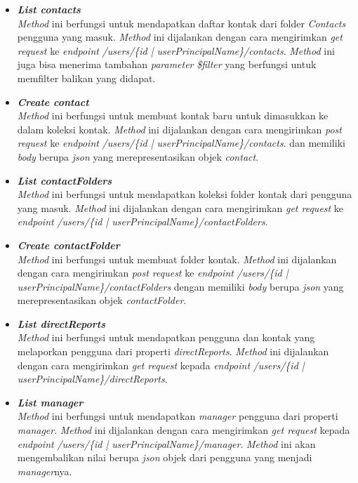 \begin{itemize}
	\item \textbf{\textit{List contacts}}\\
	\textit{Method} ini berfungsi untuk mendapatkan daftar kontak dari folder \textit{Contacts} pengguna yang masuk. \textit{Method} ini dijalankan dengan cara mengirimkan \textit{get request} ke \textit{endpoint} \textit{/users/\{id | userPrincipalName\}/contacts}. \textit{Method} ini juga bisa menerima tambahan \textit{parameter} \textit{\$filter} yang berfungsi untuk memfilter balikan yang didapat. 
	\item \textbf{\textit{Create contact}}\\
	\textit{Method} ini berfungsi untuk membuat kontak baru untuk dimasukkan ke dalam koleksi kontak. \textit{Method} ini dijalankan dengan cara mengirimkan \textit{post request} ke \textit{endpoint} \textit{/users/\{id | userPrincipalName\}/contacts}. dan memiliki \textit{body} berupa \textit{json} yang merepresentasikan objek \textit{contact}. 
	\item \textbf{\textit{List contactFolders}}\\
	\textit{Method} ini berfungsi untuk mendapatkan koleksi folder kontak dari pengguna yang masuk. \textit{Method} ini dijalankan dengan cara mengirimkan \textit{get request} ke \textit{endpoint} \textit{/users/\{id | userPrincipalName\}/contactFolders}. 
	\item \textbf{\textit{Create contactFolder}}\\
	\textit{Method} ini berfungsi untuk membuat folder kontak. \textit{Method} ini dijalankan dengan cara mengirimkan \textit{post request} ke \textit{endpoint} \textit{/users/\{id | userPrincipalName\}/contactFolders} dengan memiliki \textit{body} berupa \textit{json} yang merepresentasikan objek \textit{contactFolder}. 
	\item \textbf{\textit{List directReports}}\\
	\textit{Method} ini berfungsi untuk mendapatkan pengguna dan kontak yang melaporkan pengguna dari properti \textit{directReports}. \textit{Method} ini dijalankan dengan cara mengirimkan \textit{get request} kepada \textit{endpoint} \textit{/users/\{id | userPrincipalName\}/directReports}.
	\item \textbf{\textit{List manager}}\\
	\textit{Method} ini berfungsi untuk mendapatkan \textit{manager} pengguna dari properti \textit{manager}. \textit{Method} ini dijalankan dengan cara mengirimkan \textit{get request} kepada \textit{endpoint} \textit{/users/\{id | userPrincipalName\}/manager}. \textit{Method} ini akan mengembalikan nilai berupa \textit{json} objek dari pengguna yang menjadi \textit{manager}nya. 

\end{itemize}
